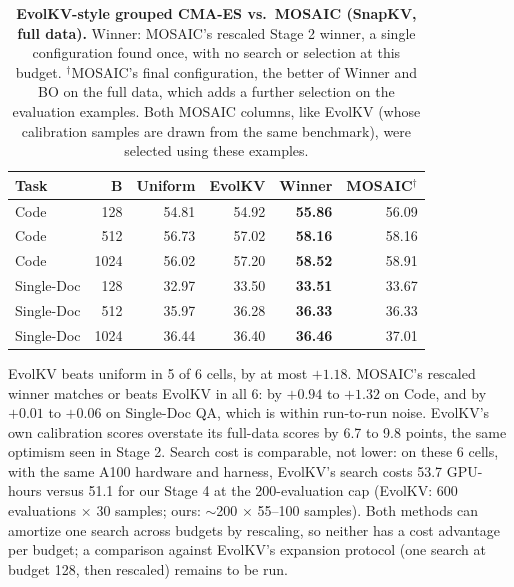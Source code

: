 \documentclass[11pt]{article}
\begin{document}
\begin{table}[t]
  \centering
  \footnotesize
  \setlength{\tabcolsep}{2.4pt}
  \begin{tabular}{@{} l r r r r r @{}}
    \toprule
    \textbf{Task} & \textbf{B} & \textbf{Uniform} & \textbf{EvolKV} & \textbf{Winner} & \textbf{MOSAIC}$^\dagger$ \\
    \midrule
    \rowcolor{gray!10}
    Code       & 128  & 54.81 & 54.92 & \textbf{55.86} & 56.09 \\
    Code       & 512  & 56.73 & 57.02 & \textbf{58.16} & 58.16 \\
    \rowcolor{gray!10}
    Code       & 1024 & 56.02 & 57.20 & \textbf{58.52} & 58.91 \\
    Single-Doc & 128  & 32.97 & 33.50 & \textbf{33.51} & 33.67 \\
    \rowcolor{gray!10}
    Single-Doc & 512  & 35.97 & 36.28 & \textbf{36.33} & 36.33 \\
    Single-Doc & 1024 & 36.44 & 36.40 & \textbf{36.46} & 37.01 \\
    \bottomrule
  \end{tabular}
  \caption{\textbf{EvolKV-style grouped CMA-ES vs.\ MOSAIC (SnapKV, full data).} Winner: MOSAIC's rescaled Stage 2 winner, a single configuration found once, with no search or selection at this budget. $^\dagger$MOSAIC's final configuration, the better of Winner and BO on the full data, which adds a further selection on the evaluation examples. Both MOSAIC columns, like EvolKV (whose calibration samples are drawn from the same benchmark), were selected using these examples.}
  \label{tab:ablation}
\end{table}

EvolKV beats uniform in 5 of 6 cells, by at most $+1.18$. MOSAIC's rescaled winner matches or beats EvolKV in all 6: by $+0.94$ to $+1.32$ on Code, and by $+0.01$ to $+0.06$ on Single-Doc QA, which is within run-to-run noise. EvolKV's own calibration scores overstate its full-data scores by 6.7 to 9.8 points, the same optimism seen in Stage 2. Search cost is comparable, not lower: on these 6 cells, with the same A100 hardware and harness, EvolKV's search costs 53.7 GPU-hours versus 51.1 for our Stage 4 at the 200-evaluation cap (EvolKV: 600 evaluations $\times$ 30 samples; ours: $\sim$200 $\times$ 55--100 samples). Both methods can amortize one search across budgets by rescaling, so neither has a cost advantage per budget; a comparison against EvolKV's expansion protocol (one search at budget 128, then rescaled) remains to be run.
\end{document}
